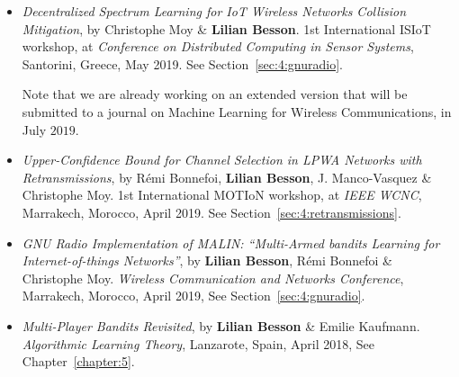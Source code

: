 \begin{itemize}
\item
    \emph{Decentralized Spectrum Learning for IoT Wireless Networks Collision Mitigation},
    by Christophe Moy \& \textbf{Lilian Besson}.
    1st International ISIoT workshop,
    at \emph{Conference on Distributed Computing in Sensor Systems},
    Santorini, Greece, May 2019.
    See Section~\ref{sec:4:gnuradio}.
    \cite{MoyBesson2019}

    Note that we are already working on an extended version that will be submitted to a journal on Machine Learning for Wireless Communications, in July $2019$.

\item
    \emph{Upper-Confidence Bound for Channel Selection in LPWA Networks with Retransmissions},
    by Rémi Bonnefoi, \textbf{Lilian Besson}, J. Manco-Vasquez \& Christophe Moy.
    1st International MOTIoN workshop,
    at \emph{IEEE WCNC}, Marrakech, Morocco, April 2019.
    See Section~\ref{sec:4:retransmissions}.
    \cite{Bonnefoi2019WCNC}

\item
    \emph{GNU Radio Implementation of MALIN: ``Multi-Armed bandits Learning for Internet-of-things Networks''},
    by \textbf{Lilian Besson}, Rémi Bonnefoi \& Christophe Moy.
    \emph{Wireless Communication and Networks Conference},
    Marrakech, Morocco, April 2019,
    See Section~\ref{sec:4:gnuradio}.
    \cite{Besson2019WCNC}

\item
    \emph{Multi-Player Bandits Revisited},
    by \textbf{Lilian Besson} \& Emilie Kaufmann.
    \emph{Algorithmic Learning Theory},
    Lanzarote, Spain, April 2018,
    See Chapter~\ref{chapter:5}.
    \cite{Besson2018ALT}


\end{itemize}
